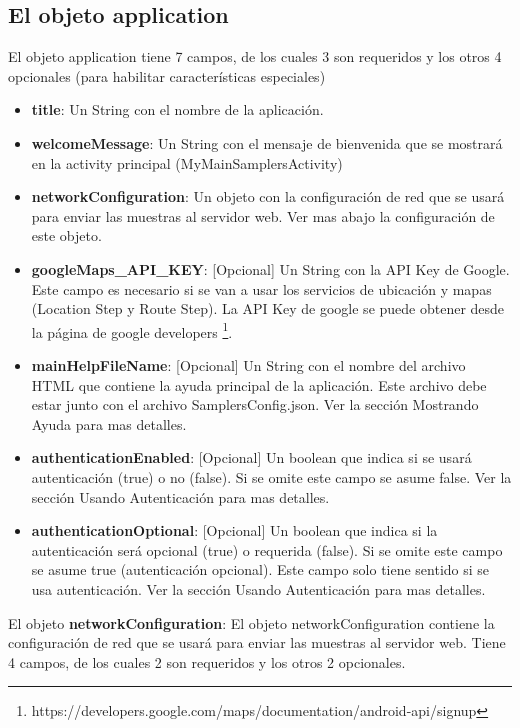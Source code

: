 \subsection{El objeto application}
	El objeto application tiene 7 campos, de los cuales 3 son requeridos y los otros 4 opcionales (para habilitar características especiales)
	\begin{itemize}
		\item \textbf{title}: Un String con el nombre de la aplicación.
		
		 \item \textbf{welcomeMessage}: Un String con el mensaje de bienvenida que se mostrará en la activity principal (MyMainSamplersActivity)
		 
		 \item \textbf{networkConfiguration}: Un objeto con la configuración de red que se usará para enviar las muestras al servidor web. Ver mas abajo la configuración de este objeto.
		 
		 \item \textbf{googleMaps\_API\_KEY}: [Opcional] Un String con la API Key de Google. Este campo es necesario si se van a usar los servicios de ubicación y mapas (Location Step y Route Step). La API Key de google se puede obtener desde la página de google developers \footnote{https://developers.google.com/maps/documentation/android-api/signup}.
		 
		 \item \textbf{mainHelpFileName}: [Opcional] Un String con el nombre del archivo HTML que contiene la ayuda principal de la aplicación. Este archivo debe estar junto con el archivo SamplersConfig.json. Ver la sección Mostrando Ayuda para mas detalles.
		 
		 \item \textbf{authenticationEnabled}: [Opcional] Un boolean que indica si se usará autenticación (true) o no (false). Si se omite este campo se asume false. Ver la sección Usando Autenticación para mas detalles.
		 
		 \item \textbf{authenticationOptional}: [Opcional] Un boolean que indica si la autenticación será opcional (true) o requerida (false). Si se omite este campo se asume true (autenticación opcional). Este campo solo tiene sentido si se usa autenticación. Ver la sección Usando Autenticación para mas detalles.
		 
	\end{itemize}
	
	
	El objeto \textbf{networkConfiguration}:
	El objeto networkConfiguration contiene la configuración de red que se usará para enviar las muestras al servidor web. Tiene 4 campos, de los cuales 2 son requeridos y los otros 2 opcionales.
	
